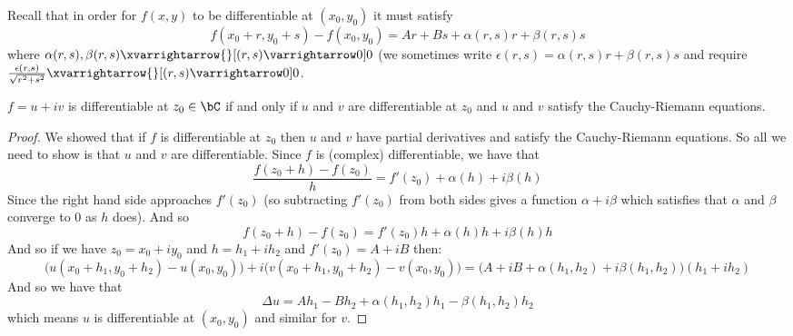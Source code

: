 \documentclass[10pt]{article}
\begin{document}
Recall that in order for $f(x,y)$ to be differentiable at $(x_0,y_0)$ it must satisfy
\[ f(x_0+r, y_0+s) - f(x_0,y_0) = Ar + Bs + \alpha(r,s)r + \beta(r,s)s \]
where $\alpha(r,s),\beta(r,s)\xvarrightarrow{}[(r,s)\varrightarrow0]0$ (we sometimes write $\epsilon(r,s)=\alpha(r,s)r+\beta(r,s)s$ and require
$\frac{\epsilon(r,s)}{\sqrt{r^2+s^2}}\xvarrightarrow{}[(r,s)\varrightarrow0]0$.

\begin{thrm*}

    $f=u+iv$ is differentiable at $z_0\in\bC$ if and only if $u$ and $v$ are differentiable at $z_0$ and $u$ and $v$ satisfy the Cauchy-Riemann equations.

\end{thrm*}

\begin{proof}

    We showed that if $f$ is differentiable at $z_0$ then $u$ and $v$ have partial derivatives and satisfy the Cauchy-Riemann equations.
    So all we need to show is that $u$ and $v$ are differentiable.
    Since $f$ is (complex) differentiable, we have that
    \[ \frac{f(z_0+h) - f(z_0)}h = f'(z_0) + \alpha(h) + i\beta(h) \]
    Since the right hand side approaches $f'(z_0)$ (so subtracting $f'(z_0)$ from both sides gives a function $\alpha+i\beta$ which satisfies that $\alpha$ and $\beta$ converge to $0$ as $h$ does).
    And so
    \[ f(z_0+h) - f(z_0) = f'(z_0)h + \alpha(h)h + i\beta(h)h \]
    And so if we have $z_0=x_0+iy_0$ and $h=h_1+ih_2$ and $f'(z_0)=A+iB$ then:
    \[ \bigl(u(x_0+h_1, y_0+h_2) - u(x_0, y_0)\bigr) + i\bigl(v(x_0+h_1, y_0+h_2) - v(x_0, y_0)\bigr) = \bigl(A+iB + \alpha(h_1,h_2) + i\beta(h_1,h_2)\bigr)(h_1+ih_2) \]
    And so we have that
    \[ \Delta u = Ah_1 - Bh_2 + \alpha(h_1,h_2)h_1 - \beta(h_1,h_2)h_2 \]
    which means $u$ is differentiable at $(x_0,y_0)$ and similar for $v$.


\end{proof}
\end{document}
